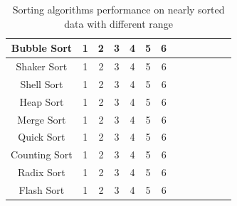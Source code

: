 \documentclass[11pt,a4paper]{article}
\begin{document}
{\begin{table}[H]
{\begin{tabular}{|c|c|c|c|c|c|c|c|c|c|c|c|c|}
		 \hline
		 Bubble Sort 	& 1 & 2 & 3 & 4 & 5 & 6\\
		 \hline
		 Shaker Sort 	& 1 & 2 & 3 & 4 & 5 & 6\\
		 \hline
		 Shell Sort		& 1 & 2 & 3 & 4 & 5 & 6\\
		 \hline
		 Heap Sort		& 1 & 2 & 3 & 4 & 5 & 6\\
		 \hline
		 Merge Sort		& 1 & 2 & 3 & 4 & 5 & 6\\
		 \hline
		 Quick Sort		& 1 & 2 & 3 & 4 & 5 & 6\\
		 \hline
		 Counting Sort 	& 1 & 2 & 3 & 4 & 5 & 6\\
		 \hline
		 Radix Sort 	& 1 & 2 & 3 & 4 & 5 & 6\\
		 \hline
		 Flash Sort 	& 1 & 2 & 3 & 4 & 5 & 6\\
		 \hline
		\end{tabular}}
		\caption{Sorting algorithms performance on nearly sorted data with different range}
		\end{table}
		
}
\end{document}
